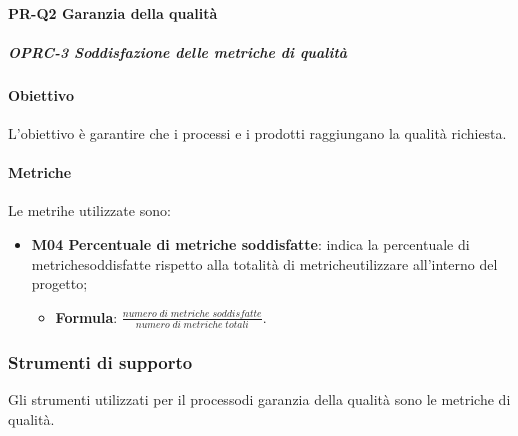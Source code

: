	\paragraph{PR-Q2 Garanzia della qualità}
	\subparagraph{OPRC-3 Soddisfazione delle metriche di qualità}
		\paragraph*{Obiettivo}
		L'obiettivo è garantire che i processi e i prodotti raggiungano la qualità richiesta.
		\paragraph*{Metriche}
		Le metrihe utilizzate sono:
			\begin{itemize}
				\item \textbf{M04 Percentuale di metriche soddisfatte}: indica la percentuale di metriche\glosp soddisfatte rispetto alla totalità di metriche\glosp utilizzare all'interno del progetto\glo;
				\begin{itemize}
					\item[] \textbf{Formula}: $\frac{numero \; di \; metriche \; soddisfatte}{numero \; di \; metriche \; totali}$.
				\end{itemize}
			\end{itemize}
\subsubsection{Strumenti di supporto}
Gli strumenti utilizzati per il processo\glosp di garanzia della qualità sono le metriche di qualità.
